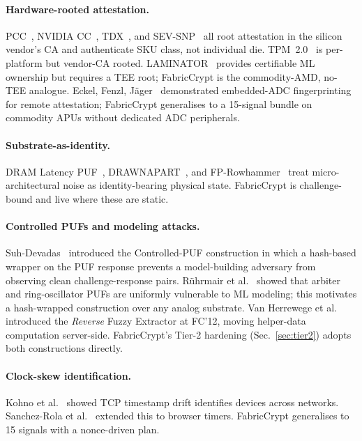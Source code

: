 \documentclass[11pt,letterpaper]{article}
\begin{document}
\paragraph{Hardware-rooted attestation.} PCC~\cite{PCC2024}, NVIDIA
CC~\cite{NVIDIACC}, TDX~\cite{TDX2024}, and SEV-SNP~\cite{SEVSNP} all
root attestation in the silicon vendor's CA and authenticate SKU class,
not individual die. TPM~2.0~\cite{TPM2} is per-platform but vendor-CA
rooted. LAMINATOR~\cite{LAMINATOR2025} provides certifiable ML
ownership but requires a TEE root; FabricCrypt is the
commodity-AMD, no-TEE analogue.
Eckel, Fenzl, J\"ager~\cite{EckelFenzlJaeger2024} demonstrated
embedded-ADC fingerprinting for remote attestation; FabricCrypt
generalises to a 15-signal bundle on commodity APUs without dedicated
ADC peripherals.

\paragraph{Substrate-as-identity.} DRAM Latency PUF~\cite{Kim2018},
DRAWNAPART~\cite{DRAWNAPART}, and FP-Rowhammer~\cite{Venugopalan2023}
treat micro-architectural noise as identity-bearing physical state.
FabricCrypt is challenge-bound and live where these are static.

\paragraph{Controlled PUFs and modeling attacks.}
Suh-Devadas~\cite{Suh2007} introduced the Controlled-PUF construction
in which a hash-based wrapper on the PUF response prevents a
model-building adversary from observing clean challenge-response pairs.
R\"uhrmair et al.~\cite{Ruhrmair2010} showed that arbiter and
ring-oscillator PUFs are uniformly vulnerable to ML modeling; this
motivates a hash-wrapped construction over any analog substrate.
Van Herrewege et al.~\cite{VanHerrewege2012} introduced the
\emph{Reverse} Fuzzy Extractor at FC'12, moving helper-data computation
server-side. FabricCrypt's Tier-2 hardening (Sec.~\ref{sec:tier2})
adopts both constructions directly.

\paragraph{Clock-skew identification.} Kohno et al.~\cite{Kohno2005}
showed TCP timestamp drift identifies devices across networks.
Sanchez-Rola et al.~\cite{SanchezRola2018} extended this to browser
timers. FabricCrypt generalises to 15 signals with a nonce-driven plan.
\end{document}
